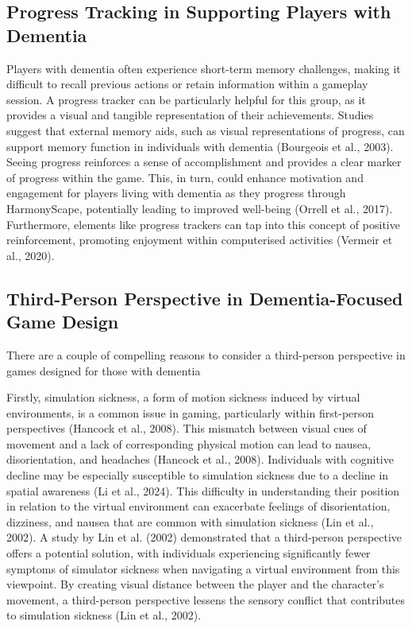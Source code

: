 \documentclass{l4proj}
\begin{document}
\subsection{Progress Tracking in Supporting Players with Dementia}\label{sec:progress_tracking}
Players with dementia often experience short-term memory challenges, making it difficult to recall previous actions or retain  information within a gameplay session. A progress tracker can be particularly helpful for this group, as it provides a visual and tangible representation of their achievements. Studies suggest that external memory aids, such as visual representations of progress, can support memory function in individuals with dementia (Bourgeois et al., 2003). Seeing progress reinforces a sense of accomplishment and  provides a clear marker of progress within the game. This, in turn, could enhance motivation and engagement for players living with dementia as they progress through HarmonyScape, potentially leading to improved well-being (Orrell et al., 2017). Furthermore, elements like progress trackers can tap into this concept of positive reinforcement, promoting enjoyment within computerised activities (Vermeir et al., 2020).

\subsection{Third-Person Perspective in Dementia-Focused Game Design}\label{sec:third_person}
There are a couple of compelling reasons to consider a third-person perspective in games designed for those with dementia

Firstly, simulation sickness, a form of motion sickness induced by virtual environments, is a common issue in gaming, particularly within first-person perspectives (Hancock et al., 2008). This mismatch between visual cues of movement and a lack of corresponding physical motion can lead to nausea, disorientation, and headaches (Hancock et al., 2008). Individuals with cognitive decline may be especially susceptible to simulation sickness due to a decline in spatial awareness (Li et al., 2024). This difficulty in understanding their position in relation to the virtual environment can exacerbate feelings of disorientation, dizziness, and nausea that are common with simulation sickness (Lin et al., 2002). A study by Lin et al. (2002) demonstrated that a third-person perspective offers a potential solution, with individuals experiencing significantly fewer symptoms of simulator sickness when navigating a virtual environment from this viewpoint. By creating visual distance between the player and the character's movement, a third-person perspective lessens the sensory conflict that contributes to simulation sickness (Lin et al., 2002).
\end{document}
